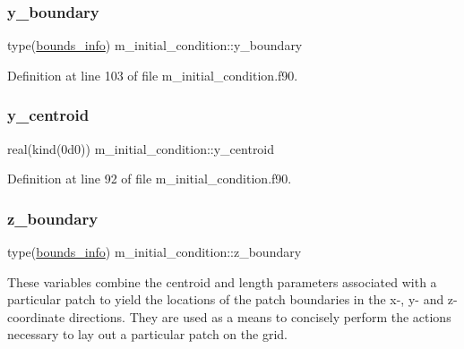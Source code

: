 \subsubsection{\texorpdfstring{y\+\_\+boundary}{y\_boundary}}
{\footnotesize\ttfamily type(\hyperlink{structm__derived__types_1_1bounds__info}{bounds\+\_\+info}) m\+\_\+initial\+\_\+condition\+::y\+\_\+boundary}



Definition at line 103 of file m\+\_\+initial\+\_\+condition.\+f90.

\mbox{\label{namespacem__initial__condition_a6cef3dccb0374a24cb372bd7d4c0b43f}} 
\subsubsection{\texorpdfstring{y\+\_\+centroid}{y\_centroid}}
{\footnotesize\ttfamily real(kind(0d0)) m\+\_\+initial\+\_\+condition\+::y\+\_\+centroid}



Definition at line 92 of file m\+\_\+initial\+\_\+condition.\+f90.

\mbox{\label{namespacem__initial__condition_aaae7053fde0b060e39db9f943f000389}} 
\subsubsection{\texorpdfstring{z\+\_\+boundary}{z\_boundary}}
{\footnotesize\ttfamily type(\hyperlink{structm__derived__types_1_1bounds__info}{bounds\+\_\+info}) m\+\_\+initial\+\_\+condition\+::z\+\_\+boundary}



These variables combine the centroid and length parameters associated with a particular patch to yield the locations of the patch boundaries in the x-\/, y-\/ and z-\/coordinate directions. They are used as a means to concisely perform the actions necessary to lay out a particular patch on the grid. 



